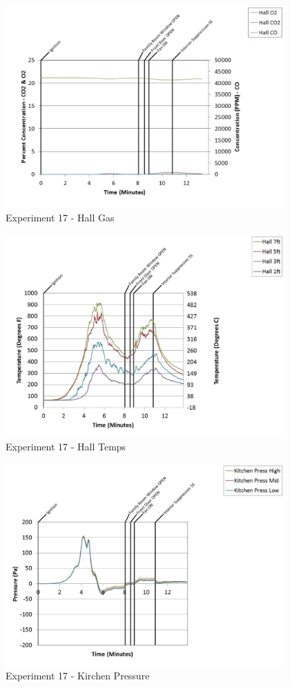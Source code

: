\documentclass{article}
\begin{document}
\begin{appendices}
	\clearpage

	\begin{figure}[h!]
		\centering
		\includegraphics[height=3.05in]{0_Images/Results_Charts/Exp_17_Charts/HallGas.pdf}
		\caption{Experiment 17 - Hall Gas}
	\end{figure}
 

	\begin{figure}[h!]
		\centering
		\includegraphics[height=3.05in]{0_Images/Results_Charts/Exp_17_Charts/HallTemps.pdf}
		\caption{Experiment 17 - Hall Temps}
	\end{figure}
 
	\clearpage

	\begin{figure}[h!]
		\centering
		\includegraphics[height=3.05in]{0_Images/Results_Charts/Exp_17_Charts/KirchenPressure.pdf}
		\caption{Experiment 17 - Kirchen Pressure}
	\end{figure}
 


\end{appendices}
\end{document}
